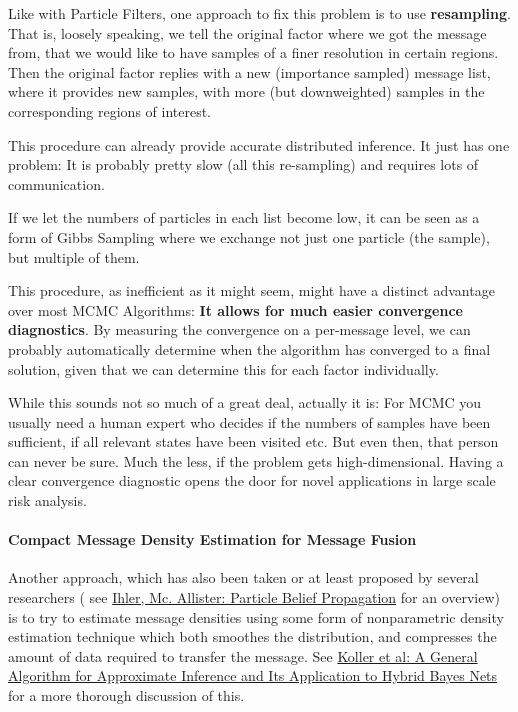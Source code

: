 Like with Particle Filters, one approach to fix this problem is to use
\textbf{resampling}. That is, loosely speaking, we tell the original
factor where we got the message from, that we would like to have samples
of a finer resolution in certain regions. Then the original factor
replies with a new (importance sampled) message list, where it provides
new samples, with more (but downweighted) samples in the corresponding
regions of interest.

This procedure can already provide accurate distributed inference. It
just has one problem: It is probably pretty slow (all this re-sampling)
and requires lots of communication.

If we let the numbers of particles in each list become low, it can be
seen as a form of Gibbs Sampling where we exchange not just one particle
(the sample), but multiple of them.

This procedure, as inefficient as it might seem, might have a distinct
advantage over most MCMC Algorithms: \textbf{It allows for much easier
convergence diagnostics}. By measuring the convergence on a per-message
level, we can probably automatically determine when the algorithm has
converged to a final solution, given that we can determine this for each
factor individually.

While this sounds not so much of a great deal, actually it is: For MCMC
you usually need a human expert who decides if the numbers of samples
have been sufficient, if all relevant states have been visited etc. But
even then, that person can never be sure. Much the less, if the problem
gets high-dimensional. Having a clear convergence diagnostic opens the
door for novel applications in large scale risk analysis.

\paragraph{Compact Message Density Estimation for Message Fusion}

Another approach, which has also been taken or at least proposed by
several researchers ( see
\href{http://mach\%20inelearning.wustl.edu/mlpapers/paper\_files/AISTATS09\_IhlerM.pdf}{Ihler,
Mc. Allister: Particle Belief Propagation} for an overview) is to try to
estimate message densities using some form of nonparametric density
estimation technique which both smoothes the distribution, and
compresses the amount of data required to transfer the message. See
\href{http://robotics.stanford.edu/~koller/Papers/Koller+al:UAI99.pdf}{Koller
et al: A General Algorithm for Approximate Inference and Its Application
to Hybrid Bayes Nets} for a more thorough discussion of this.

